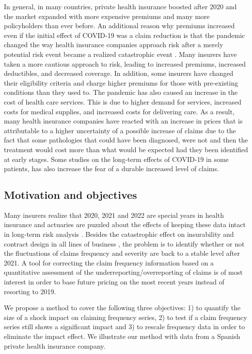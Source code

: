 \documentclass[]{risa}
\begin{document}
In general, in many countries, private health insurance boosted after 2020 and the market expanded with more expensive premiums and many more policyholders than ever before. An additional reason why premiums increased even if the initial effect of COVID-19 was a claim reduction is that the pandemic changed the way health insurance companies approach risk after a merely potential risk event became a realized catastrophic event \cite{richter2020covid}. Many insurers have taken a more cautious approach to risk, leading to increased premiums, increased deductibles, and decreased coverage. In addition, some insurers have changed their eligibility criteria and charge higher premiums for those with pre-existing conditions than they used to. The pandemic has also caused an increase in the cost of health care services\cite{poisal2022national}. This is due to higher demand for services, increased costs for medical supplies, and increased costs for delivering care. As a result, many health insurance companies have reacted with an increase in prices that is attributable to a higher uncertainty of a possible increase of claims due to the fact that some pathologies that could have been diagnosed, were not and then the treatment would cost more than what would be expected had they been identified at early stages. Some studies on the long-term effects of COVID-19 in some patients, has also increase the fear of a durable increased level of claims. 

\subsection{Motivation and objectives}

Many insurers realize that 2020, 2021 and 2022 are special years in health insurance and actuaries are puzzled about the effects of keeping these data intact in long-term risk analysis \cite{biancalana2022quantitative}. Besides the catastrophic effect on insurability and contract design in all lines of business \cite{hartwig2020insurance}, the problem is to identify whether or not the fluctuations of claims frequency and severity are back to a stable level after 2021. A tool for correcting the claim frequency information based on a quantitative assessment of the underreporting/overreporting of claims is of most interest in order to base future pricing on the most recent years instead of resorting to 2019. 

We propose a method to cover the following three objectives: 1) to quantify the size of a shock impact on claiming frequency series,  2) to test if a claim frequency series still shows a significant impact and 3) to rescale frequency data in order to eliminate the impact effect. We illustrate our method with data from a Spanish private health insurance company. 
\end{document}
